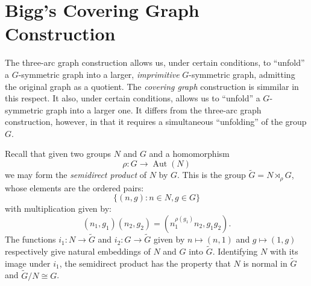 \documentclass[12pt]{amsart}
\theoremstyle{plain}
\theoremstyle{definition}
\theoremstyle{remark}
\DeclareMathOperator{\Aut}{Aut}
\DeclareMathOperator{\grp}{Grp}
\newcommand{\cD}{\mathcal{D}}
\begin{document}
%
%
%


\section{Bigg's Covering Graph Construction}

The three-arc graph construction allows us, under certain conditions,
to ``unfold'' a $G$-symmetric graph into a larger, {\it imprimitive}
$G$-symmetric graph, admitting the original graph as a quotient.
The {\it covering graph} construction \cite{B1974} is simmilar
in this respect. It also, under certain conditions,
allows us to ``unfold'' a $G$-symmetric graph into a larger one.
It differs from the three-arc graph construction, however,
in that it requires a simultaneous ``unfolding''
of the group $G$.

Recall that given two groups $N$ and $G$ and a homomorphism
$$\rho : G \to \Aut(N)$$
we may form the {\it semidirect product} of $N$ by $G$.
This is the group $\widetilde{G} = N \rtimes_\rho G$, 
whose elements are the ordered pairs: 
$$\{ (n,g) : n \in N, g \in G \}$$
with multiplication given by:
$$(n_1, g_1)(n_2,g_2) = (n_1^{\rho(g_1)}n_2, g_1g_2).$$
The functions $i_1 : N \to \widetilde{G}$ and $i_2 : G \to \widetilde{G}$
given by $ n \mapsto (n,1) $ and $ g \mapsto (1,g) $ respectively give
natural embeddings of $N$ and $G$ into $\widetilde{G}$.
Identifying $N$ with its image under $i_1$,
the semidirect product has the property that $N$ is normal in $\widetilde{G}$
and $\widetilde{G}/N \cong G$.
\end{document}
